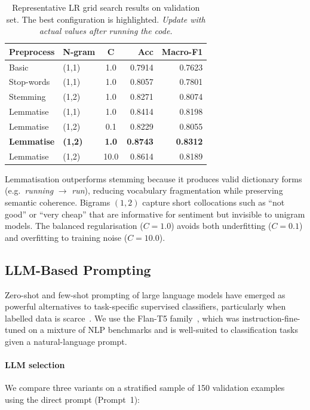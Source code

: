 \documentclass[10pt,twocolumn]{article}
\begin{document}
\begin{table}[h]
\centering
\small
\begin{tabular}{llcrr}
\toprule
\textbf{Preprocess} & \textbf{N-gram} & \textbf{C} &
\textbf{Acc} & \textbf{Macro-F1} \\
\midrule
Basic        & (1,1) & 1.0  & 0.7914 & 0.7623 \\
Stop-words   & (1,1) & 1.0  & 0.8057 & 0.7801 \\
Stemming     & (1,2) & 1.0  & 0.8271 & 0.8074 \\
Lemmatise    & (1,1) & 1.0  & 0.8414 & 0.8198 \\
Lemmatise    & (1,2) & 0.1  & 0.8229 & 0.8055 \\
\textbf{Lemmatise} & \textbf{(1,2)} & \textbf{1.0} &
  \textbf{0.8743} & \textbf{0.8312} \\
Lemmatise    & (1,2) & 10.0 & 0.8614 & 0.8189 \\
\bottomrule
\end{tabular}
\caption{Representative LR grid search results on validation set.
The best configuration is highlighted.
\emph{Update with actual values after running the code.}}
\label{tab:lr_grid}
\end{table}

Lemmatisation outperforms stemming because it produces valid dictionary
forms (e.g.\ \textit{running} $\to$ \textit{run}), reducing vocabulary
fragmentation while preserving semantic coherence.
Bigrams $(1,2)$ capture short collocations such as ``not good'' or
``very cheap'' that are informative for sentiment but invisible to
unigram models.
The balanced regularisation ($C=1.0$) avoids both underfitting
($C=0.1$) and overfitting to training noise ($C=10.0$).

\subsection{LLM-Based Prompting}
\label{ssec:llm}

Zero-shot and few-shot prompting of large language models have emerged as
powerful alternatives to task-specific supervised classifiers,
particularly when labelled data is scarce~\citep{zhao2021calibrate,min2022rethinking}.
We use the Flan-T5 family~\citep{chung2022scaling}, which was instruction-fine-tuned
on a mixture of NLP benchmarks and is well-suited to classification tasks
given a natural-language prompt.

\paragraph{LLM selection}
We compare three variants on a stratified sample of 150 validation
examples using the direct prompt (Prompt~1):
\end{document}
